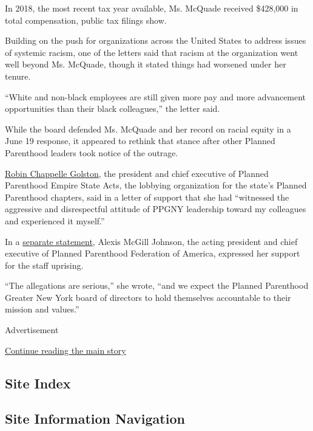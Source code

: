 In 2018, the most recent tax year available, Ms. McQuade received
\$428,000 in total compensation, public tax filings show.

Building on the push for organizations across the United States to
address issues of systemic racism, one of the letters said that racism
at the organization went well beyond Ms. McQuade, though it stated
things had worsened under her tenure.

``White and non-black employees are still given more pay and more
advancement opportunities than their black colleagues,'' the letter
said.

While the board defended Ms. McQuade and her record on racial equity in
a June 19 response, it appeared to rethink that stance after other
Planned Parenthood leaders took notice of the outrage.

\href{https://saveppgny.files.wordpress.com/2020/06/ppesa-letter.jpeg}{Robin
Chappelle Golston}, the president and chief executive of Planned
Parenthood Empire State Acts, the lobbying organization for the state's
Planned Parenthood chapters, said in a letter of support that she had
``witnessed the aggressive and disrespectful attitude of PPGNY
leadership toward my colleagues and experienced it myself.''

In a
\href{https://www.plannedparenthood.org/about-us/newsroom/press-releases/ppfa-statement-on-open-letters-from-affiliate-staff}{separate
statement}, Alexis McGill Johnson, the acting president and chief
executive of Planned Parenthood Federation of America, expressed her
support for the staff uprising.

``The allegations are serious,'' she wrote, ``and we expect the Planned
Parenthood Greater New York board of directors to hold themselves
accountable to their mission and values.''

Advertisement

\protect\hyperlink{after-bottom}{Continue reading the main story}

\hypertarget{site-index}{%
\subsection{Site Index}\label{site-index}}

\hypertarget{site-information-navigation}{%
\subsection{Site Information
Navigation}\label{site-information-navigation}}

